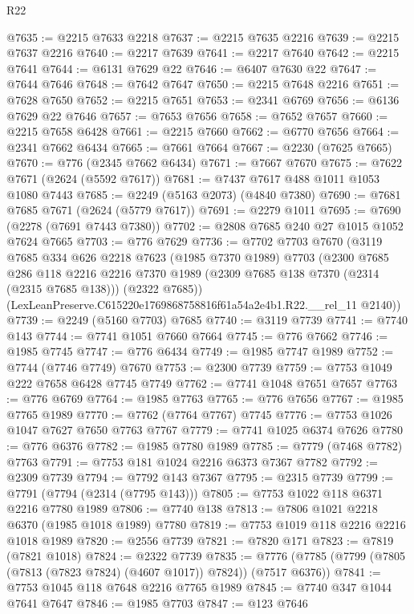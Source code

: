 \begin{lexlean}{R22}
\begin{coremodule}
@7635 := @2215 @7633 @2218
@7637 := @2215 @7635 @2216
@7639 := @2215 @7637 @2216
@7640 := @2217 @7639
@7641 := @2217 @7640
@7642 := @2215 @7641
@7644 := @6131 @7629 @22
@7646 := @6407 @7630 @22
@7647 := @7644 @7646
@7648 := @7642 @7647
@7650 := @2215 @7648 @2216
@7651 := @7628 @7650
@7652 := @2215 @7651
@7653 := @2341 @6769
@7656 := @6136 @7629 @22 @7646
@7657 := @7653 @7656
@7658 := @7652 @7657
@7660 := @2215 @7658 @6428
@7661 := @2215 @7660
@7662 := @6770 @7656
@7664 := @2341 @7662 @6434
@7665 := @7661 @7664
@7667 := @2230 (@7625 @7665)
@7670 := @776 (@2345 @7662 @6434)
@7671 := @7667 @7670
@7675 := @7622 @7671 (@2624 (@5592 @7617))
@7681 := @7437 @7617 @488 @1011 @1053 @1080 @7443
@7685 := @2249 (@5163 @2073) (@4840 @7380)
@7690 := @7681 @7685 @7671 (@2624 (@5779 @7617))
@7691 := @2279 @1011
@7695 := @7690 (@2278 (@7691 @7443 @7380))
@7702 := @2808 @7685 @240 @27 @1015 @1052 @7624 @7665
@7703 := @776 @7629
@7736 := @7702
    @7703
    @7670
    (@3119
      @7685
      @334
      @626
      @2218
      @7623
      (@1985 @7370 @1989)
      @7703
      (@2300
        @7685
        @286
        @118
        @2216
        @2216
        @7370
        @1989
        (@2309 @7685 @138 @7370 (@2314 (@2315 @7685 @138)))
        (@2322 @7685))
      (LexLeanPreserve.C615220e1769868758816f61a54a2e4b1.R22.__rel_11 @2140))
@7739 := @2249 (@5160 @7703) @7685
@7740 := @3119 @7739
@7741 := @7740 @143
@7744 := @7741 @1051 @7660 @7664
@7745 := @776 @7662
@7746 := @1985 @7745
@7747 := @776 @6434
@7749 := @1985 @7747 @1989
@7752 := @7744 (@7746 @7749) @7670
@7753 := @2300 @7739
@7759 := @7753 @1049 @222 @7658 @6428 @7745 @7749
@7762 := @7741 @1048 @7651 @7657
@7763 := @776 @6769
@7764 := @1985 @7763
@7765 := @776 @7656
@7767 := @1985 @7765 @1989
@7770 := @7762 (@7764 @7767) @7745
@7776 := @7753 @1026 @1047 @7627 @7650 @7763 @7767
@7779 := @7741 @1025 @6374 @7626
@7780 := @776 @6376
@7782 := @1985 @7780 @1989
@7785 := @7779 (@7468 @7782) @7763
@7791 := @7753 @181 @1024 @2216 @6373 @7367 @7782
@7792 := @2309 @7739
@7794 := @7792 @143 @7367
@7795 := @2315 @7739
@7799 := @7791 (@7794 (@2314 (@7795 @143)))
@7805 := @7753 @1022 @118 @6371 @2216 @7780 @1989
@7806 := @7740 @138
@7813 := @7806 @1021 @2218 @6370 (@1985 @1018 @1989) @7780
@7819 := @7753 @1019 @118 @2216 @2216 @1018 @1989
@7820 := @2556 @7739
@7821 := @7820 @171
@7823 := @7819 (@7821 @1018)
@7824 := @2322 @7739
@7835 := @7776 (@7785 (@7799 (@7805 (@7813 (@7823 @7824) (@4607 @1017)) @7824)) (@7517 @6376))
@7841 := @7753 @1045 @118 @7648 @2216 @7765 @1989
@7845 := @7740 @347 @1044 @7641 @7647
@7846 := @1985 @7703
@7847 := @123 @7646

\end{coremodule}
\end{lexlean}
